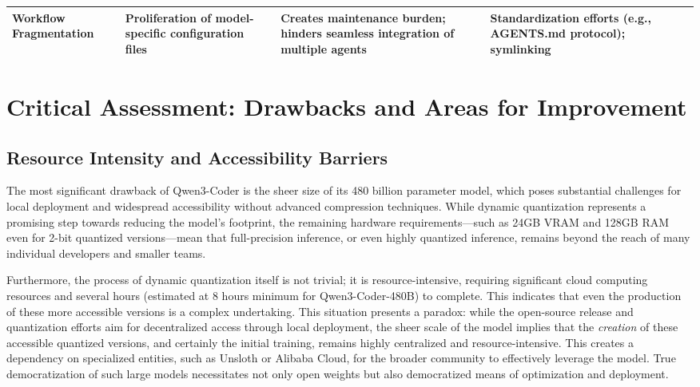 \begin{table}[htbp]
\begin{tabu}{XXXXX}
		\textbf{Workflow Fragmentation}      & Proliferation of model-specific configuration files                   & Creates maintenance burden; hinders seamless integration of multiple agents                               & Standardization efforts (e.g., AGENTS.md protocol); symlinking                           & \cite{hackernews_qwen3coder_2025}                                                                              \\
        \bottomrule
	\end{tabu}
\end{table}

\section{Critical Assessment: Drawbacks and Areas for Improvement}

\subsection{Resource Intensity and Accessibility Barriers}

The most significant drawback of Qwen3-Coder is the sheer size of its 480 billion parameter model, which poses substantial challenges for local deployment and widespread accessibility without advanced compression techniques.\cite{hackernews_qwen3coder_2025} While dynamic quantization represents a promising step towards reducing the model's footprint, the remaining hardware requirements—such as 24GB VRAM and 128GB RAM even for 2-bit quantized versions—mean that full-precision inference, or even highly quantized inference, remains beyond the reach of many individual developers and smaller teams.\cite{hackernews_qwen3coder_2025}

Furthermore, the process of dynamic quantization itself is not trivial; it is resource-intensive, requiring significant cloud computing resources and several hours (estimated at 8 hours minimum for Qwen3-Coder-480B) to complete.\cite{hackernews_qwen3coder_2025} This indicates that even the production of these more accessible versions is a complex undertaking. This situation presents a paradox: while the open-source release and quantization efforts aim for decentralized access through local deployment, the sheer scale of the model implies that the \textit{creation} of these accessible quantized versions, and certainly the initial training, remains highly centralized and resource-intensive. This creates a dependency on specialized entities, such as Unsloth or Alibaba Cloud, for the broader community to effectively leverage the model. True democratization of such large models necessitates not only open weights but also democratized means of optimization and deployment.

